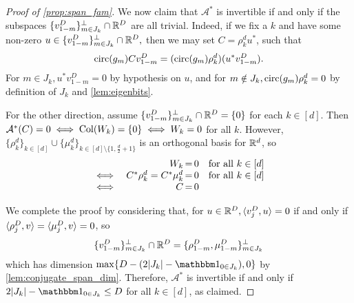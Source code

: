 \begin{proof}[Proof of \cref{prop:span_fam}]
  We now claim that $\mathcal{A}^*$ is invertible if and only if the subspaces $\{v_{1 - m}^D\}_{m \in J_k}^\perp \cap \mathbb{R}^D$ are all trivial.  Indeed, if we fix a $k$ and have some non-zero $u \in \{v_{1 - m}^D\}_{m \in J_k}^\perp \cap \mathbb{R}^D,$ then we may set $C = \rho_k^d u^*$, such that \[\operatorname{circ}(g_m) C v_{1 - m}^D = (\operatorname{circ}(g_m) \rho_k^d) (u^* v_{1 - m}^D).\]  For $m \in J_k, u^* v_{1 - m}^D = 0$ by hypothesis on $u$, and for $m \notin J_k, \operatorname{circ}(g_m) \rho_k^d = 0$ by definition of $J_k$ and \cref{lem:eigenbits}.

  For the other direction, assume $\{v_{1 - m}^D\}_{m \in J_k}^\perp \cap \mathbb{R}^D = \{0\}$ for each $k \in [d]$.  Then $\mathcal{A}^*(C) = 0 \iff \operatorname{Col}(W_k) = \{0\} \iff W_k = 0$ for all $k$.  However, $\{\rho_k^d\}_{k \in [d]} \cup \{\mu_k^d\}_{k \in [d] \setminus \{1, \frac{d}{2} + 1\}}$ is an orthogonal basis for $\mathbb{R}^d$, so \[\begin{array}{cr@{\,=\,}lr} & W_k & 0 & \text{for all} \ k \in [d] \\ \iff & C^* \rho_k^d = C^* \mu_k^d & 0 & \text{for all} \ k \in [d] \\ \iff & C & 0 & \end{array}\]


  We complete the proof by considering that, for $u \in \mathbb{R}^{D}, \langle v_j^D, u \rangle = 0$ if and only if $\langle\rho_j^D, v\rangle = \langle\mu_j^D, v\rangle = 0$, so \[\{v^D_{1 - m}\}_{m \in J_k}^\perp \cap \mathbb{R}^{D} = \{\rho_{1 - m}^D, \mu_{1 - m}^D\}_{m \in J_k}^\perp\] which has dimension $\max\{D - (2|J_k| - \one_{0 \in J_k}), 0\}$ by \cref{lem:conjugate_span_dim}.  Therefore, $\mathcal{A}^*$ is invertible if and only if $2|J_k| - \one_{0 \in J_k} \le D$ for all $k \in [d]$, as claimed.
\end{proof}


